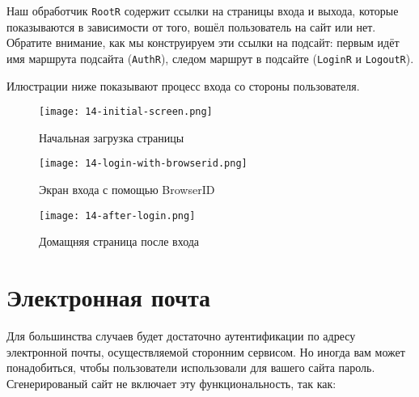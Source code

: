 Наш обработчик \lstinline'RootR' содержит ссылки на страницы входа и выхода, которые показываются в зависимости от того, вошёл пользователь на сайт или нет. Обратите внимание, как мы конструируем эти ссылки на подсайт: первым идёт имя маршрута подсайта (\lstinline'AuthR'), следом маршрут в подсайте (\lstinline'LoginR' и \lstinline'LogoutR').

Илюстрации ниже показывают процесс входа со стороны пользователя.

\begin{figure}[h!]
  \centering
  \texttt{[image: 14-initial-screen.png]}
  \caption{Начальная загрузка страницы}
\end{figure}

\begin{figure}[h!]
  \centering
  \texttt{[image: 14-login-with-browserid.png]}
  \caption{Экран входа с помощью BrowserID}
\end{figure}

\begin{figure}[h!]
  \centering
  \texttt{[image: 14-after-login.png]}
  \caption{Домащняя страница после входа}
\end{figure}

\section{Электронная почта}

Для большинства случаев будет достаточно аутентификации по адресу электронной почты, осуществляемой сторонним сервисом. Но иногда вам может понадобиться, чтобы пользователи использовали для вашего сайта пароль. Сгенерированый сайт не включает эту функциональность, так как:

